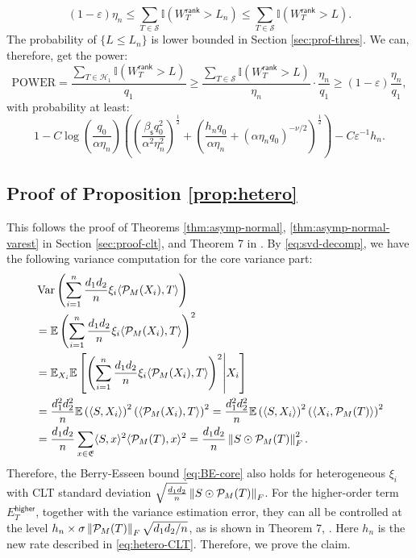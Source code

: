 \documentclass[12pt]{article}
\newcommand{\tF}{{\rm F}}
\newcommand{\norm}[1]{\left\lVert#1\right\rVert}
\newcommand{\E}{\mathbb{E}}
\newcommand{\cH}{\mathcal{H}}
\newcommand{\cP}{\mathcal{P}}
\newcommand{\cS}{\mathcal{S}}
\newcommand{\bbI}{\mathbb{I}}
\newcommand{\higher}{ {\mathsf{higher}} }
\theoremstyle{plain}
\begin{document}
\begin{equation*}
  (1-\varepsilon)\eta_n \le   \sum\limits_{T\in\cS} \bbI(W_T^\mathsf{rank}> L_n) \le \sum\limits_{T\in\cS} \bbI(W_T^\mathsf{rank}> L).
\end{equation*}
The probability of $\{L\le L_n\}$ is lower bounded in Section \ref{sec:prof-thres}. We can, therefore, get the power:
\begin{equation*}
    \text{POWER}= \frac{\sum\limits_{T\in\cH_1} \bbI(W_T^\mathsf{rank}> L)}{q_1}\ge \frac{\sum\limits_{T\in\cS} \bbI(W_T^\mathsf{rank}> L)}{\eta_n} \cdot \frac{\eta_n}{q_1}\ge (1-\varepsilon)\frac{\eta_n}{q_1},
\end{equation*}
with probability at least:
\begin{equation*}
      1-C \log(\frac{q_0 }{\alpha \eta_n})\left( \left(\frac{\beta_{\mathsf{s}} q_0^2 }{ \alpha^2\eta_n^2}\right)^{\frac{1}{2}} + \left(\frac{h_n q_0}{\alpha \eta_n}+(\alpha\eta_n q_0)^{-\nu/2} \right)^{\frac{1}{2}}\right)- C \varepsilon^{-1} h_n.
\end{equation*}




\subsection{Proof of Proposition \ref{prop:hetero}}
This follows the proof of Theorems \ref{thm:asymp-normal}, \ref{thm:asymp-normal-varest} in Section \ref{sec:proof-clt}, and Theorem 7 in \cite{ma2024statistical}. By \eqref{eq:svd-decomp}, we have the following variance computation for the core variance part:
\begin{equation*}
\begin{aligned}
        & \operatorname{Var}\left(\sum_{i=1}^n \frac{d_1 d_2}{n}\xi_i\langle \cP_M( X_i),T\rangle \right)
        \\
        & = \E\left(\sum_{i=1}^n \frac{d_1 d_2}{n}\xi_i\langle \cP_M( X_i),T\rangle\right)^2 
       \\
       & = \E_{X_i} \E\left[\left(\sum_{i=1}^n \frac{d_1 d_2}{n}\xi_i\langle \cP_M( X_i),T\rangle\right)^2\middle| X_i\right]
       \\
       & = \frac{d_1^2 d_2^2}{n}\E \left( \langle S,X_i \rangle \right)^2 \left(\langle\cP_M( X_i),T\rangle\right)^2 =\frac{d_1^2 d_2^2}{n}\E  \left( \langle S,X_i \rangle \right)^2\left(\langle X_i,\cP_M(T) \rangle\right)^2 
       \\
       &=  \frac{d_1 d_2}{ n}\sum_{x\in \mathfrak{E}}  \langle S,x \rangle^2   \langle \cP_M(T),x \rangle^2 = \frac{d_1 d_2}{ n}\norm{S\odot \cP_M(T)}_{\tF}^2.
\end{aligned}
\end{equation*}
Therefore, the Berry-Esseen  bound \eqref{eq:BE-core}  also holds for heterogeneous $\xi_i$ with CLT standard deviation $\sqrt{\frac{d_1 d_2}{n}}\norm{S\odot \cP_M(T)}_{\tF}$.  For the higher-order term $E_T^{\higher}$, together with the variance estimation error, they can all be controlled at the level $h_n\times \sigma \norm{\cP_M(T)}_{\tF} \sqrt{d_1 d_2/n}$,  as is shown in Theorem 7, \cite{ma2024statistical}. Here $h_n$ is  the new rate described in \eqref{eq:hetero-CLT}. Therefore, we prove the claim.
\end{document}
